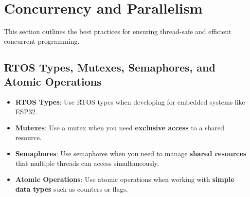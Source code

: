 \section{Concurrency and Parallelism}
This section outlines the best practices for ensuring thread-safe and efficient concurrent programming.

\subsection{RTOS Types, Mutexes, Semaphores, and Atomic Operations}
\begin{itemize}
    \item \textbf{RTOS Types}: Use RTOS types when developing for embedded systems like ESP32.
    \item \textbf{Mutexes}: Use a mutex when you need \textbf{exclusive access} to a shared resource.
    \item \textbf{Semaphores}: Use semaphores when you need to manage \textbf{shared resources} that multiple threads can access simultaneously.
    \item \textbf{Atomic Operations}: Use atomic operations when working with \textbf{simple data types} such as counters or flags.
\end{itemize}

